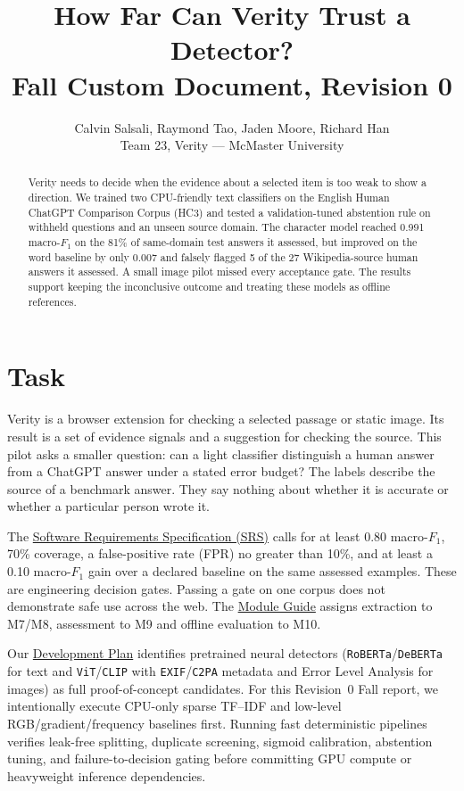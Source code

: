 \documentclass[11pt]{article}
\title{How Far Can Verity Trust a Detector?\\
       Fall Custom Document, Revision 0}
\author{Calvin Salsali, Raymond Tao, Jaden Moore, Richard Han \\
        Team 23, Verity --- McMaster University}
\newcommand{\repo}{https://github.com/richy1337/Verity}
\newcommand{\papers}{\repo/blob/main/pdfs}
\begin{document}
\maketitle

\begin{abstract}
Verity needs to decide when the evidence about a selected item is too weak to show a direction. We trained two CPU-friendly text classifiers on the English Human ChatGPT Comparison Corpus (HC3) and tested a validation-tuned abstention rule on withheld questions and an unseen source domain. The character model reached 0.991 macro-$F_1$ on the 81\% of same-domain test answers it assessed, but improved on the word baseline by only 0.007 and falsely flagged 5 of the 27 Wikipedia-source human answers it assessed. A small image pilot missed every acceptance gate. The results support keeping the inconclusive outcome and treating these models as offline references.
\end{abstract}

\section{Task}

Verity is a browser extension for checking a selected passage or static image. Its result is a set of evidence signals and a suggestion for checking the source. This pilot asks a smaller question: can a light classifier distinguish a human answer from a ChatGPT answer under a stated error budget? The labels describe the source of a benchmark answer. They say nothing about whether it is accurate or whether a particular person wrote it.

The \href{\papers/SRS/SRS.pdf}{Software Requirements Specification (SRS)} calls for at least 0.80 macro-$F_1$, 70\% coverage, a false-positive rate (FPR) no greater than 10\%, and at least a 0.10 macro-$F_1$ gain over a declared baseline on the same assessed examples. These are engineering decision gates. Passing a gate on one corpus does not demonstrate safe use across the web. The \href{\papers/Design/SoftArchitecture/MG.pdf}{Module Guide} assigns extraction to M7/M8, assessment to M9 and offline evaluation to M10.

Our \href{\papers/DevelopmentPlan/DevelopmentPlan.pdf}{Development Plan} identifies pretrained neural detectors (\texttt{RoBERTa}/\texttt{DeBERTa} for text and \texttt{ViT}/\texttt{CLIP} with \texttt{EXIF}/\texttt{C2PA} metadata and Error Level Analysis for images) as full proof-of-concept candidates. For this Revision~0 Fall report, we intentionally execute CPU-only sparse TF--IDF and low-level RGB/gradient/frequency baselines first. Running fast deterministic pipelines verifies leak-free splitting, duplicate screening, sigmoid calibration, abstention tuning, and failure-to-decision gating before committing GPU compute or heavyweight inference dependencies.
\end{document}
